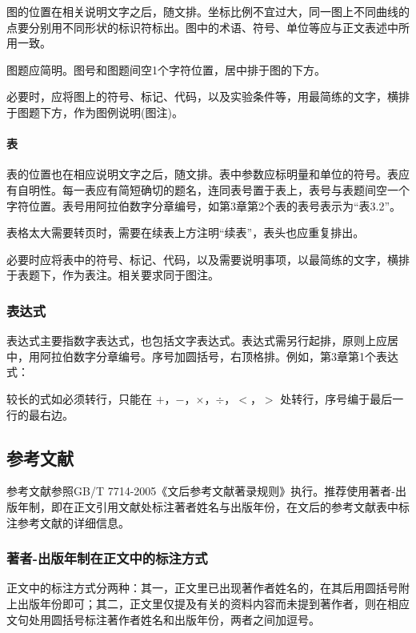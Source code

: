 图的位置在相关说明文字之后，随文排。坐标比例不宜过大，同一图上不同曲线的点要分别用不同形状的标识符标出。图中的术语、符号、单位等应与正文表述中所用一致。

图题应简明。图号和图题间空1个字符位置，居中排于图的下方。

必要时，应将图上的符号、标记、代码，以及实验条件等，用最简练的文字，横排于图题下方，作为图例说明(图注)。

\paragraph{表}
表的位置也在相应说明文字之后，随文排。表中参数应标明量和单位的符号。表应有自明性。每一表应有简短确切的题名，连同表号置于表上，表号与表题间空一个字符位置。表号用阿拉伯数字分章编号，如第3章第2个表的表号表示为“表3.2”。

表格太大需要转页时，需要在续表上方注明“续表”，表头也应重复排出。

必要时应将表中的符号、标记、代码，以及需要说明事项，以最简练的文字，横排于表题下，作为表注。相关要求同于图注。

\subsubsection{表达式}

表达式主要指数字表达式，也包括文字表达式。表达式需另行起排，原则上应居中，用阿拉伯数字分章编号。序号加圆括号，右顶格排。例如，第3章第1个表达式：

较长的式如必须转行，只能在 $+$，$-$，$\times$，$\div$，$<$，$>$ 处转行，序号编于最后一行的最右边。

\subsection{参考文献}

参考文献参照GB/T 7714-2005《文后参考文献著录规则》执行。推荐使用著者-出版年制，即在正文引用文献处标注著者姓名与出版年份，在文后的参考文献表中标注参考文献的详细信息。

\subsubsection{著者-出版年制在正文中的标注方式}

正文中的标注方式分两种：其一，正文里已出现著作者姓名的，在其后用圆括号附上出版年份即可；其二，正文里仅提及有关的资料内容而未提到著作者，则在相应文句处用圆括号标注著作者姓名和出版年份，两者之间加逗号。

